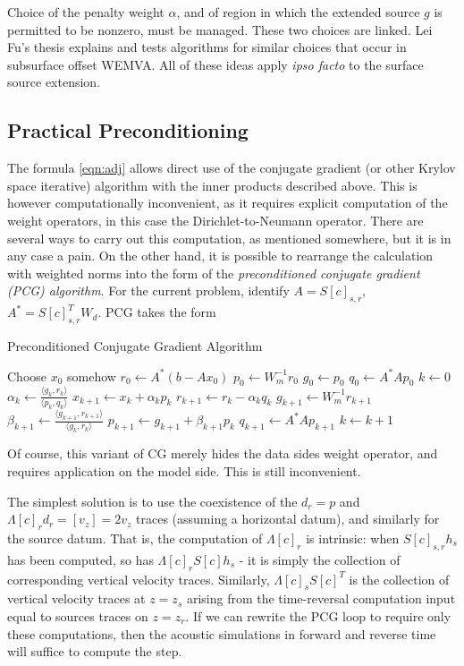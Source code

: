 Choice of the penalty weight $\alpha$, and of region in which the extended source $g$ is permitted to be nonzero, must be managed. These two choices are linked. Lei Fu's thesis \cite[]{Fu:Geo17,Fu:Geo17b} explains and tests algorithms for similar choices that occur in subsurface offset WEMVA. All of these ideas apply {\em ipso facto} to the surface source extension.

\subsection{Practical Preconditioning}

The formula \ref{eqn:adj} allows direct use of the conjugate gradient (or other Krylov space iterative) algorithm with the inner products described above. This is however computationally inconvenient, as it requires explicit computation of the weight operators, in this case the Dirichlet-to-Neumann operator. There are several ways to carry out this computation, as mentioned somewhere, but it is in any case a  pain. On the other hand, it is possible to rearrange the calculation with weighted norms into the form of the {\em preconditioned conjugate gradient (PCG) algorithm}. For the current problem, identify $A=S[c]_{s,r}$, $A^* = S[c]_{s,r}^T W_d$. PCG takes the form
\begin{algorithm}[H]
\caption{Preconditioned Conjugate Gradient Algorithm}
\begin{algorithmic}[1]
\State Choose $x_0$ somehow
  \State $r_0 \gets A^*(b-Ax_0)$
  \State $p_0 \gets W_m^{-1}r_0$
  \State $g_0 \gets p_0$
  \State $q_0 \gets A^*Ap_0$
  \State $k \gets 0$
  \Repeat
  \State $\alpha_k \gets \frac{\langle g_k,r_k \rangle}{\langle p_k,q_k\rangle}$
  \State $x_{k+1} \gets x_k + \alpha_k p_k$
  \State $r_{k+1} \gets r_k - \alpha_kq_k$
  \State $g_{k+1} \gets W_m^{-1}r_{k+1}$
  \State $\beta_{k+1} \gets \frac{\langle g_{k+1},r_{k+1}\rangle}{\langle g_k,r_k\rangle}$
  \State $p_{k+1}\gets g_{k+1}+\beta_{k+1}p_k$
  \State $q_{k+1} \gets A^*Ap_{k+1}$
  \State $k \gets k+1$
\end{algorithmic}
\end{algorithm}
Of course, this variant of CG merely hides the data sides weight operator, and requires application on the model side. This is still inconvenient. 

The simplest solution is to use the coexistence of the $d_r=p$ and $\Lambda[c]_rd_r =[v_z]=2v_z$ traces (assuming a horizontal datum), and similarly for the source datum. That is, the computation of $\Lambda[c]_r$ is intrinsic: when $S[c]_{s,r}h_s$ has been computed, so has $\Lambda[c]_rS[c]h_s$ - it is simply the collection of corresponding vertical velocity traces. Similarly,  $\Lambda[c]_sS[c]^T$ is the collection of vertical velocity traces at $z=z_s$ arising from the time-reversal computation input equal to sources traces on $z=z_r$. If we can rewrite the PCG loop to require only these computations, then the acoustic simulations in forward and reverse time will suffice to compute the step.

